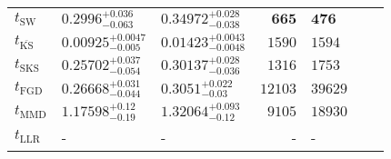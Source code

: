 \begin{tabular}{l|llr|llr}
	\midrule
	$t_{\mathrm{SW}}$ & $0.2996_{-0.063}^{+0.036}$ & $0.34972_{-0.038}^{+0.028}$ & ${\mathbf{665}}$ & ${\mathbf{476}}$ \\
	$t_{\overline{\mathrm{KS}}}$ & ${\mathbf{0.00925_{-0.005}^{+0.0047}}}$ & ${\mathbf{0.01423_{-0.0048}^{+0.0043}}}$ & $1590$ & $1594$ \\
	$t_{\mathrm{SKS}}$ & $0.25702_{-0.054}^{+0.037}$ & $0.30137_{-0.036}^{+0.028}$ & $1316$ & $1753$ \\
	$t_{\mathrm{FGD}}$ & $0.26668_{-0.044}^{+0.031}$ & $0.3051_{-0.03}^{+0.022}$ & $12103$ & $39629$ \\
	$t_{\mathrm{MMD}}$ & $1.17598_{-0.19}^{+0.12}$ & $1.32064_{-0.12}^{+0.093}$ & $9105$ & $18930$ \\
	$t_{\mathrm{LLR}}$ & - & - & - & - \\
	\bottomrule
\end{tabular}